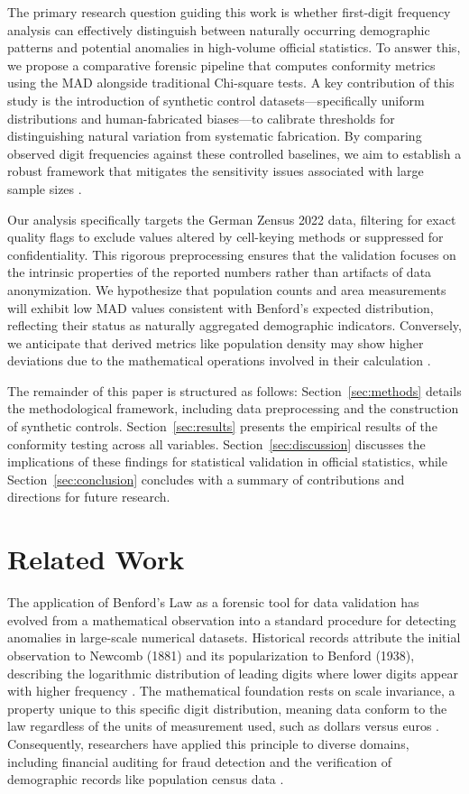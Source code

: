 \documentclass[11pt,a4paper]{article}
\begin{document}
The primary research question guiding this work is whether first-digit frequency analysis can effectively distinguish between naturally occurring demographic patterns and potential anomalies in high-volume official statistics. To answer this, we propose a comparative forensic pipeline that computes conformity metrics using the MAD alongside traditional Chi-square tests. A key contribution of this study is the introduction of synthetic control datasets—specifically uniform distributions and human-fabricated biases—to calibrate thresholds for distinguishing natural variation from systematic fabrication. By comparing observed digit frequencies against these controlled baselines, we aim to establish a robust framework that mitigates the sensitivity issues associated with large sample sizes \cite{Schafer2005AutomatieIO}.

Our analysis specifically targets the German Zensus 2022 data, filtering for exact quality flags to exclude values altered by cell-keying methods or suppressed for confidentiality. This rigorous preprocessing ensures that the validation focuses on the intrinsic properties of the reported numbers rather than artifacts of data anonymization. We hypothesize that population counts and area measurements will exhibit low MAD values consistent with Benford's expected distribution, reflecting their status as naturally aggregated demographic indicators. Conversely, we anticipate that derived metrics like population density may show higher deviations due to the mathematical operations involved in their calculation \cite{Sinik2025TestingLA}.

The remainder of this paper is structured as follows: Section~\ref{sec:methods} details the methodological framework, including data preprocessing and the construction of synthetic controls. Section~\ref{sec:results} presents the empirical results of the conformity testing across all variables. Section~\ref{sec:discussion} discusses the implications of these findings for statistical validation in official statistics, while Section~\ref{sec:conclusion} concludes with a summary of contributions and directions for future research.

\section{Related Work}
The application of Benford's Law as a forensic tool for data validation has evolved from a mathematical observation into a standard procedure for detecting anomalies in large-scale numerical datasets. Historical records attribute the initial observation to Newcomb (1881) and its popularization to Benford (1938), describing the logarithmic distribution of leading digits where lower digits appear with higher frequency \cite{Miller2015BenfordsLT}. The mathematical foundation rests on scale invariance, a property unique to this specific digit distribution, meaning data conform to the law regardless of the units of measurement used, such as dollars versus euros \cite{Cole2019TestingTE}. Consequently, researchers have applied this principle to diverse domains, including financial auditing for fraud detection and the verification of demographic records like population census data \cite{Shalini2023DataQA}.
\end{document}
